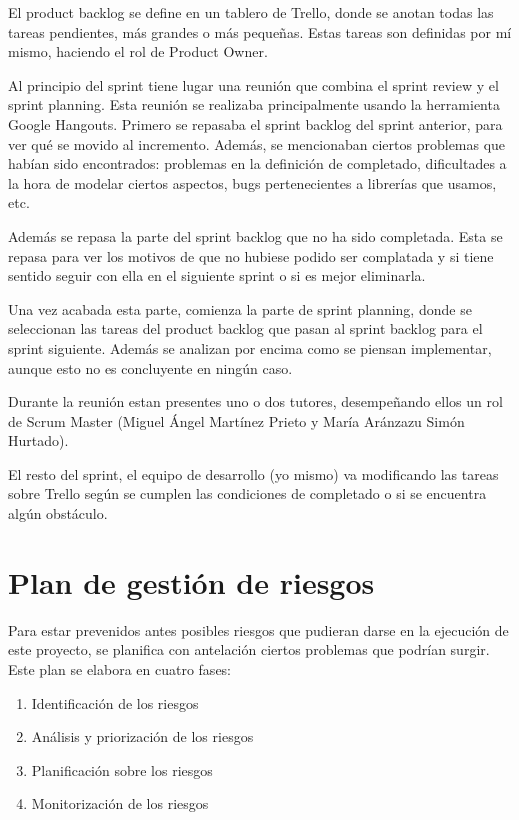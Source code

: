 \documentclass[12pt]{report} %
\begin{document}
El product backlog se define en un tablero de Trello, donde se anotan todas las tareas pendientes, más grandes o más pequeñas. Estas tareas son definidas por mí mismo, haciendo el rol de Product Owner.

Al principio del sprint tiene lugar una reunión que combina el sprint review y el sprint planning. Esta reunión se realizaba principalmente usando la herramienta Google Hangouts. Primero se repasaba el sprint backlog del sprint anterior, para ver qué se movido al incremento. Además, se mencionaban ciertos problemas que habían sido encontrados: problemas en la definición de completado, dificultades a la hora de modelar ciertos aspectos, bugs pertenecientes a librerías que usamos, etc.

Además se repasa la parte del sprint backlog que no ha sido completada. Esta se repasa para ver los motivos de que no hubiese podido ser complatada y si tiene sentido seguir con ella en el siguiente sprint o si es mejor eliminarla.

Una vez acabada esta parte, comienza la parte de sprint planning, donde se seleccionan las tareas del product backlog que pasan al sprint backlog para el sprint siguiente. Además se analizan por encima como se piensan implementar, aunque esto no es concluyente en ningún caso.

Durante la reunión estan presentes uno o dos tutores, desempeñando ellos un rol de Scrum Master (Miguel Ángel Martínez Prieto y María Aránzazu Simón Hurtado).

El resto del sprint, el equipo de desarrollo (yo mismo) va modificando las tareas sobre Trello según se cumplen las condiciones de completado o si se encuentra algún obstáculo.

\section{Plan de gestión de riesgos}

Para estar prevenidos antes posibles riesgos que pudieran darse en la ejecución de este proyecto, se planifica con antelación ciertos problemas que podrían surgir. Este plan se elabora en cuatro fases:
\begin{enumerate}
    \item Identificación de los riesgos
    \item Análisis y priorización de los riesgos
    \item Planificación sobre los riesgos
    \item Monitorización de los riesgos
\end{enumerate}
\end{document}
